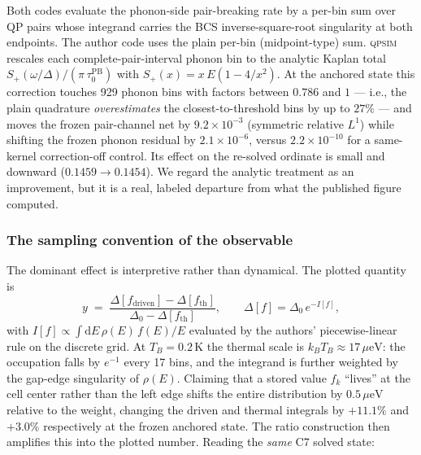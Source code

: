 \documentclass[reprint,amsmath,amssymb,aps,prapplied,nofootinbib]{revtex4-2}
\newcommand{\qpsim}{\textsc{qpsim}}
\newcommand{\ueV}{\,\mu\mathrm{eV}}
\begin{document}
Both codes evaluate the phonon-side pair-breaking rate by a per-bin sum
over QP pairs whose integrand carries the BCS inverse-square-root
singularity at both endpoints.  The author code uses the plain
per-bin (midpoint-type) sum.  \qpsim{} rescales each
complete-pair-interval phonon bin to the analytic Kaplan total
$S_+(\omega/\Delta)/(\pi\,\tau_0^{\mathrm{PB}})$ with
$S_+(x) = x\,E(1-4/x^2)$.  At the anchored state this correction
touches 929 phonon bins with factors between $0.786$ and $1$ --- i.e.,
the plain quadrature \emph{overestimates} the closest-to-threshold bins
by up to $27\%$ --- and moves the frozen pair-channel net by
$9.2\times10^{-3}$ (symmetric relative $L^1$) while shifting the frozen
phonon residual by $2.1\times10^{-6}$, versus $2.2\times10^{-10}$ for a
same-kernel correction-off control.  Its effect on the re-solved
ordinate is small and downward ($0.1459 \to 0.1454$).  We regard the
analytic treatment as an improvement, but it is a real, labeled
departure from what the published figure computed.

\subsubsection{The sampling convention of the observable}
\label{sec:sampling}

The dominant effect is interpretive rather than dynamical.  The plotted
quantity is
\begin{equation}
y \;=\; \frac{\Delta[f_{\mathrm{driven}}] - \Delta[f_{\mathrm{th}}]}
             {\Delta_0 - \Delta[f_{\mathrm{th}}]},
\qquad
\Delta[f] = \Delta_0\, e^{-I[f]},
\end{equation}
with $I[f] \propto \int \mathrm{d}E\, \rho(E)\, f(E)/E$ evaluated by the
authors' piecewise-linear rule on the discrete grid.  At $T_B = 0.2\,$K
the thermal scale is $k_B T_B \approx 17\ueV$: the occupation falls by
$e^{-1}$ every 17 bins, and the integrand is further weighted by the
gap-edge singularity of $\rho(E)$.  Claiming that a stored value
$f_k$ ``lives'' at the cell center rather than the left edge shifts the
entire distribution by $0.5\ueV$ relative to the weight, changing the
driven and thermal integrals by $+11.1\%$ and $+3.0\%$ respectively at
the frozen anchored state.  The ratio construction then amplifies this
into the plotted number.  Reading the \emph{same} C7 solved state:
\end{document}
